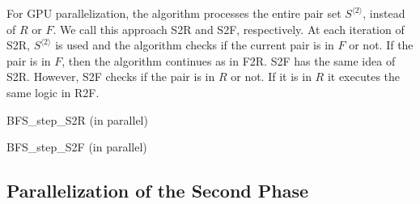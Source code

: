 \documentclass[12pt]{article}
\begin{document}
For GPU parallelization, the algorithm processes the entire pair set $S^{\langle 2 \rangle}$, instead of $R$ or $F$. We call this approach S2R and S2F, respectively. At each iteration of S2R, $S^{\langle 2 \rangle}$ is used and the algorithm checks if the current pair is in $F$ or not. If the pair is in $F$, then the algorithm continues as in F2R. S2F has the same idea of S2R. However, S2F checks if the pair is in $R$ or not. If it is in $R$ it executes the same logic in R2F. 

\begin{algorithm}[ht]
	\label{algo:BFS-step-S2R-Parallel}
	\caption{BFS\_step\_S2R (in parallel)}
	
	
	{
	}
	
\end{algorithm}

\begin{algorithm}[ht]
	\label{algo:BFS-step-S2F-Parallel}
	\caption{BFS\_step\_S2F (in parallel)}
	
	
		{
		}
\end{algorithm}


\subsection{Parallelization of the Second Phase}
\label{sec:second-phase-parallelization}
\end{document}
